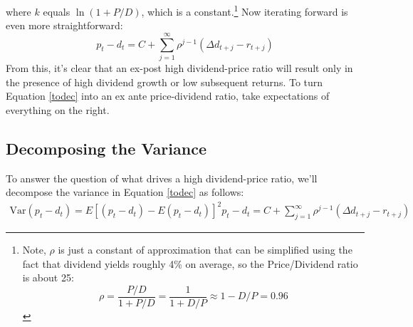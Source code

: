 \documentclass[a4paper,12pt]{scrartcl}
\begin{document}
where $k$ equals $\ln(1+P/D)$, which is a constant.\footnote{Note,
$\rho$ is just a constant of approximation that can be simplified
using the fact that dividend yields roughly 4\% on average, so
the Price/Dividend ratio is about 25:
    \[ \rho = \frac{P/D}{1+P/D} = \frac{1}{1+ D/P} \approx 1 - D/P = 0.96 \]
}
Now iterating forward is even more straightforward:
\begin{equation}
    \label{todec}
    p_t - d_t = C +  \sum^\infty_{j=1} \rho^{j-1} (\Delta d_{t+j}
	- r_{t+j})
\end{equation}
From this, it's clear that an ex-post high dividend-price ratio will result
only in the presence of high dividend growth or low subsequent returns.
To turn Equation \ref{todec} into an ex ante price-dividend ratio,
take expectations of everything on the right.


\newpage
\subsection{Decomposing the Variance}

To answer the question of what drives a high dividend-price ratio,
we'll decompose the variance in Equation \ref{todec} as follows:
\begin{align*}
    \text{Var}(p_t - d_t) = E\left[ (p_t - d_t) - E(p_t - d_t) \right]^2
    p_t - d_t = C +  \sum^\infty_{j=1} \rho^{j-1} (\Delta d_{t+j}
	- r_{t+j})
\end{align*}







% 
\end{document}
